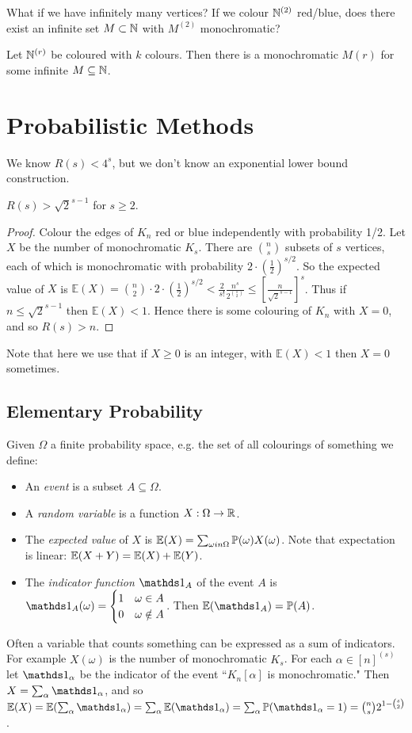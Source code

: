 \documentclass[10pt,a4paper]{article}
\begin{document}
What if we have infinitely many vertices? If we colour $\mathbb{N}^{(2)}$ red/blue, does there exist an infinite set $M \subset \mathbb{N}$ with $M^{(2)}$ monochromatic?

\begin{theorem}
Let $\mathbb{N}^{(r)}$ be coloured with $k$ colours. Then there is a monochromatic $M{(r)}$ for some infinite $M \subseteq \mathbb{N}$.
\end{theorem}

\section{Probabilistic Methods}
We know $R(s) < 4^s$, but we don't know an exponential lower bound construction.
\begin{theorem}[Erd\"os 1947]
$R(s) > \sqrt{2}^{s-1}$ for $s \geq 2$.
\end{theorem}
\begin{proof}
Colour the edges of $K_n$ red or blue independently with probability 1/2. Let $X$ be the number of monochromatic $K_s$. There are $\binom{n}{s}$ subsets of $s$ vertices, each of which is monochromatic with probability $2\cdot\left(\frac{1}{2}\right)^{s/2}$. So the expected value of $X$ is $\mathbb{E}(X) = \binom{n}{2}\cdot 2 \cdot \left(\frac{1}{2}\right)^{s/2} < \frac{2}{s!}\frac{n^s}{2^{\binom{s}{2}}} \leq \left[\frac{n}{\sqrt{2}^{s-1}}\right]^s$. Thus if $n \leq \sqrt{2}^{s-1}$ then $\mathbb{E}(X) <1$. Hence there is some colouring of $K_n$ with $X=0$, and so $R(s) > n$.
\end{proof}
Note that here we use that if $X \geq 0$ is an integer, with $\mathbb{E}(X)<1$ then $X=0$ sometimes.

\subsection*{Elementary Probability}
Given $\Omega$ a finite probability space, e.g. the set of all colourings of something we define:
\begin{itemize}
\item An \emph{event} is a subset $A \subseteq \Omega$.
\item A \emph{random variable} is a function $X: \Omega \to \mathbb{R}$.
\item The \emph{expected value} of $X$ is $\mathbb{E}(X) = \sum_{\omega in \Omega} \mathbb{P}(\omega)X(\omega)$. Note that expectation is linear: $\mathbb{E}(X+Y) = \mathbb{E}(X) + \mathbb{E}(Y)$.
\item The \emph{indicator function} $\one_A$ of the event $A$ is $\one_A(\omega) = \begin{cases} 1 & \omega \in A \\ 0 & \omega \notin A \end{cases}$. Then $\E(\one_A) = \P(A)$.
\end{itemize}
Often a variable that counts something can be expressed as a sum of indicators. For example $X(\omega)$ is the number of monochromatic $K_s$. For each $\alpha \in [n]^{(s)}$ let $\one_{\alpha}$ be the indicator of the event ``$K_n[\alpha]$ is monochromatic." Then $X = \sum_{\alpha} \one_{\alpha}$, and so $\E(X) = \E(\sum_{\alpha} \one_\alpha) = \sum_\alpha \E(\one_\alpha) = \sum_\alpha \P(\one_\alpha = 1) = \binom{n}{s}2^{1-\binom{s}{2}}$.
\end{document}
